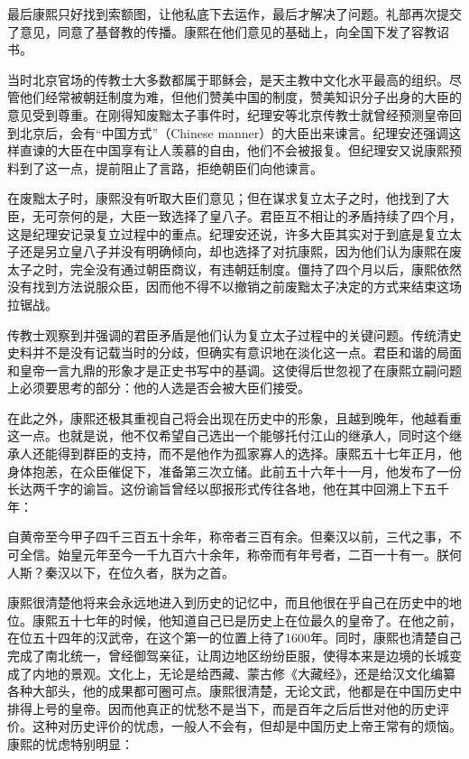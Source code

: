 
最后康熙只好找到索额图，让他私底下去运作，最后才解决了问题。礼部再次提交了意见，同意了基督教的传播。康熙在他们意见的基础上，向全国下发了容教诏书。



当时北京官场的传教士大多数都属于耶稣会，是天主教中文化水平最高的组织。尽管他们经常被朝廷制度为难，但他们赞美中国的制度，赞美知识分子出身的大臣的意见受到尊重。在刚得知废黜太子事件时，纪理安等北京传教士就曾经预测皇帝回到北京后，会有“中国方式”（Chinese manner）的大臣出来谏言。纪理安还强调这样直谏的大臣在中国享有让人羡慕的自由，他们不会被报复。但纪理安又说康熙预料到了这一点，提前阻止了言路，拒绝朝臣们向他谏言。



在废黜太子时，康熙没有听取大臣们意见；但在谋求复立太子之时，他找到了大臣，无可奈何的是，大臣一致选择了皇八子。君臣互不相让的矛盾持续了四个月，这是纪理安记录复立过程中的重点。纪理安还说，许多大臣其实对于到底是复立太子还是另立皇八子并没有明确倾向，却也选择了对抗康熙，因为他们认为康熙在废太子之时，完全没有通过朝臣商议，有违朝廷制度。僵持了四个月以后，康熙依然没有找到方法说服众臣，因而他不得不以撤销之前废黜太子决定的方式来结束这场拉锯战。



传教士观察到并强调的君臣矛盾是他们认为复立太子过程中的关键问题。传统清史史料并不是没有记载当时的分歧，但确实有意识地在淡化这一点。君臣和谐的局面和皇帝一言九鼎的形象才是正史书写中的基调。这使得后世忽视了在康熙立嗣问题上必须要思考的部分：他的人选是否会被大臣们接受。



在此之外，康熙还极其重视自己将会出现在历史中的形象，且越到晚年，他越看重这一点。也就是说，他不仅希望自己选出一个能够托付江山的继承人，同时这个继承人还能得到群臣的支持，而不是他作为孤家寡人的选择。康熙五十七年正月，他身体抱恙，在众臣催促下，准备第三次立储。此前五十六年十一月，他发布了一份长达两千字的谕旨。这份谕旨曾经以邸报形式传往各地，他在其中回溯上下五千年：



\begin{bookquote}自黄帝至今甲子四千三百五十余年，称帝者三百有余。但秦汉以前，三代之事，不可全信。始皇元年至今一千九百六十余年，称帝而有年号者，二百一十有一。朕何人斯？秦汉以下，在位久者，朕为之首。\end{bookquote}


康熙很清楚他将来会永远地进入到历史的记忆中，而且他很在乎自己在历史中的地位。康熙五十七年的时候，他知道自己已是历史上在位最久的皇帝了。在他之前，在位五十四年的汉武帝，在这个第一的位置上待了1600年。同时，康熙也清楚自己完成了南北统一，曾经御驾亲征，让周边地区纷纷臣服，使得本来是边境的长城变成了内地的景观。文化上，无论是给西藏、蒙古修《大藏经》，还是给汉文化编纂各种大部头，他的成果都可圈可点。康熙很清楚，无论文武，他都是在中国历史中排得上号的皇帝。因而他真正的忧愁不是当下，而是百年之后后世对他的历史评价。这种对历史评价的忧虑，一般人不会有，但却是中国历史上帝王常有的烦恼。康熙的忧虑特别明显：


